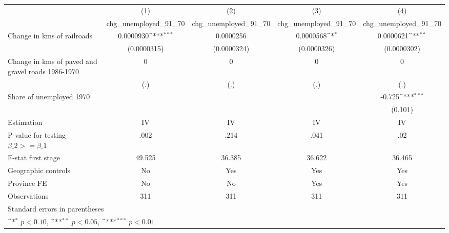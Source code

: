 {
\def\sym#1{\ifmmode^{#1}\else\(^{#1}\)\fi}
\begin{tabular}{l*{4}{c}}
\hline\hline
                &\multicolumn{1}{c}{(1)}&\multicolumn{1}{c}{(2)}&\multicolumn{1}{c}{(3)}&\multicolumn{1}{c}{(4)}\\
                &\multicolumn{1}{c}{chg\_unemployed\_91\_70}&\multicolumn{1}{c}{chg\_unemployed\_91\_70}&\multicolumn{1}{c}{chg\_unemployed\_91\_70}&\multicolumn{1}{c}{chg\_unemployed\_91\_70}\\
\hline
Change in kms of railroads&0.0000930\sym{***}&0.0000256         &0.0000568\sym{*}  &0.0000621\sym{**} \\
                &(0.0000315)         &(0.0000324)         &(0.0000326)         &(0.0000302)         \\
[1em]
Change in kms of paved and gravel roads 1986-1970&        0         &        0         &        0         &        0         \\
                &      (.)         &      (.)         &      (.)         &      (.)         \\
[1em]
Share of unemployed 1970&                  &                  &                  &   -0.725\sym{***}\\
                &                  &                  &                  &  (0.101)         \\
\hline
Estimation      &       IV         &       IV         &       IV         &       IV         \\
P-value for testing $\beta\_2 >= \beta\_1$&     .002         &     .214         &     .041         &      .02         \\
F-stat first stage&   49.525         &   36.385         &   36.622         &   36.465         \\
Geographic controls&       No         &      Yes         &      Yes         &      Yes         \\
Province FE     &       No         &       No         &      Yes         &      Yes         \\
Observations    &      311         &      311         &      311         &      311         \\
\hline\hline
\multicolumn{5}{l}{\footnotesize Standard errors in parentheses}\\
\multicolumn{5}{l}{\footnotesize \sym{*} \(p<0.10\), \sym{**} \(p<0.05\), \sym{***} \(p<0.01\)}\\
\end{tabular}
}
